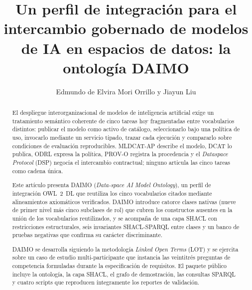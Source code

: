 \documentclass[Afour,sagev,times]{sagej}
\begin{document}

\title{Un perfil de integración para el intercambio gobernado de modelos de IA en espacios de datos: la ontología DAIMO}

\author{Edmundo de Elvira Mori Orrillo y Jiayun Liu}




\begin{abstract}
El despliegue interorganizacional de modelos de inteligencia artificial exige un tratamiento semántico coherente de cinco tareas hoy fragmentadas entre vocabularios distintos: publicar el modelo como activo de catálogo, seleccionarlo bajo una política de uso, invocarlo mediante un servicio tipado, trazar cada ejecución y compararlo sobre condiciones de evaluación reproducibles. MLDCAT-AP describe el modelo, DCAT lo publica, ODRL expresa la política, PROV-O registra la procedencia y el \emph{Dataspace Protocol} (DSP) negocia el intercambio contractual; ninguno articula las cinco tareas como cadena única.

Este artículo presenta DAIMO (\emph{Data-space AI Model Ontology}), un perfil de integración OWL~2~DL que reutiliza los cinco vocabularios citados mediante alineamientos axiomáticos verificados. DAIMO introduce catorce clases nativas (nueve de primer nivel más cinco subclases de rol) que cubren los constructos ausentes en la unión de los vocabularios reutilizados, y se acompaña de una capa SHACL con restricciones estructurales, seis invariantes SHACL-SPARQL entre clases y un banco de pruebas negativas que confirma su carácter discriminante.

DAIMO se desarrolla siguiendo la metodología \emph{Linked Open Terms} (LOT) y se ejercita sobre un caso de estudio multi-participante que instancia las veintitrés preguntas de competencia formuladas durante la especificación de requisitos. El paquete público incluye la ontología, la capa SHACL, el grafo de demostración, las consultas SPARQL y cuatro scripts que reproducen íntegramente los reportes de validación.
\end{abstract}
\end{document}
